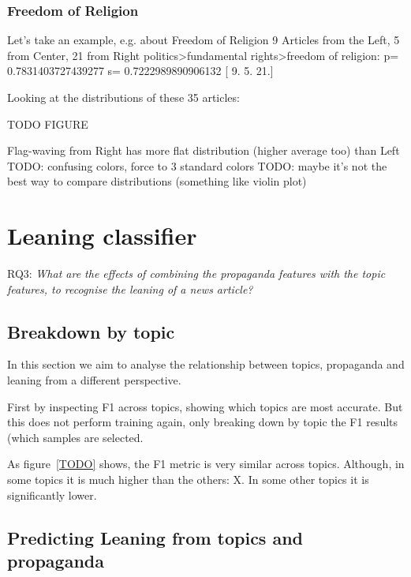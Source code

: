 \subsubsection{Freedom of Religion}
Let’s take an example, e.g. about Freedom of Religion
9 Articles from the Left, 5 from Center, 21 from Right
politics>fundamental rights>freedom of religion: p= 0.7831403727439277 s= 0.7222989890906132 [ 9.  5. 21.]

Looking at the distributions of these 35 articles:

TODO FIGURE

Flag-waving from Right has more flat distribution (higher average too) than Left
TODO: confusing colors, force to 3 standard colors
TODO: maybe it’s not the best way to compare distributions (something like violin plot)



\section{\statusred Leaning classifier}
\label{sec:topic_classifier_propaganda}

RQ3: \emph{What are the effects of combining the propaganda features with the topic features, to recognise the leaning of a news article?}

\subsection{Breakdown by topic}


In this section we aim to analyse the relationship between topics, propaganda and leaning from a different perspective.

First by inspecting F1 across topics, showing which topics are most accurate.
But this does not perform training again, only breaking down by topic the F1 results (which samples are selected.


As figure~\ref{TODO} shows, the F1 metric is very similar across topics.
Although, in some topics it is much higher than the others: X.
In some other topics it is significantly lower.




\subsection{Predicting Leaning from topics and propaganda}
\label{sec:topic_classifier_propaganda_2}

